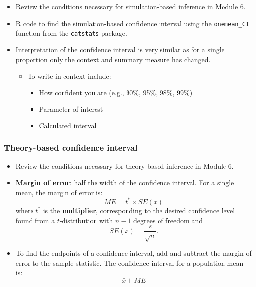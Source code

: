 \documentclass[
]{report}
\newenvironment{Shaded}{\begin{snugshade}}{\end{snugshade}}
\newcommand{\AttributeTok}[1]{\textcolor[rgb]{0.13,0.29,0.53}{#1}}
\newcommand{\CommentTok}[1]{\textcolor[rgb]{0.56,0.35,0.01}{\textit{#1}}}
\newcommand{\DecValTok}[1]{\textcolor[rgb]{0.00,0.00,0.81}{#1}}
\newcommand{\FunctionTok}[1]{\textcolor[rgb]{0.13,0.29,0.53}{\textbf{#1}}}
\newcommand{\NormalTok}[1]{#1}
\newcommand{\SpecialCharTok}[1]{\textcolor[rgb]{0.81,0.36,0.00}{\textbf{#1}}}
\newcommand{\StringTok}[1]{\textcolor[rgb]{0.31,0.60,0.02}{#1}}
\begin{document}
\begin{itemize}
\item
  Review the conditions necessary for simulation-based inference in Module 6.
\item
  R code to find the simulation-based confidence interval using the \texttt{onemean\_CI} function from the \texttt{catstats} package.

\begin{Shaded}
\end{Shaded}
\item
  Interpretation of the confidence interval is very similar as for a single proportion only the context and summary measure has changed.

  \begin{itemize}
  \item
    To write in context include:

    \begin{itemize}
    \item
      How confident you are (e.g., 90\%, 95\%, 98\%, 99\%)
    \item
      Parameter of interest
    \item
      Calculated interval
    \end{itemize}
  \end{itemize}
\end{itemize}

\subsubsection*{Theory-based confidence interval}\label{theory-based-confidence-interval-1}

\begin{itemize}
\item
  Review the conditions necessary for theory-based inference in Module 6.
\item
  \textbf{Margin of error}: half the width of the confidence interval. For a single mean, the margin of error is:
  \[ME = t^* \times SE(\bar{x})\]
  where \(t^*\) is the \textbf{multiplier}, corresponding to the desired confidence level found from a \(t\)-distribution with \(n-1\) degrees of freedom and \[SE(\bar{x}) = \frac{s}{\sqrt{n}}.\]
\item
  To find the endpoints of a confidence interval, add and subtract the margin of error to the sample statistic. The confidence interval for a population mean is:
  \[\bar{x} \pm ME\]
\end{itemize}
\end{document}
